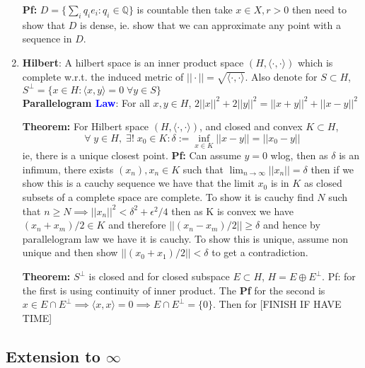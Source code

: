 \documentclass{article}
\begin{document}
\begin{enumerate}
    \textbf{Pf:} \(D = \{\sum_iq_ie_i:q_i \in \mathbb{Q}\}\) is countable then take \(x \in X, r>0\) then need to show that \(D\) is dense, ie. show that we can approximate any point with a sequence in \(D\).
    
    \item \textbf{Hilbert}: A hilbert space is an inner product space \((H, \langle\cdot, \cdot\rangle) \) which is complete w.r.t. the induced metric of \(||\cdot || = \sqrt{\langle\cdot, \cdot\rangle}\). Also denote for \(S\subset H\), \(S^\perp = \{x \in H: \langle x, y \rangle = 0 \; \forall y \in S\}\)\\

    \textbf{Parallelogram \textcolor{blue}{Law}}: For all \(x, y \in H\), \(2||x||^2 + 2 ||y||^2 = ||x + y||^2 + ||x - y||^2\)
    
    \textbf{Theorem: } For Hilbert space \((H, \langle\cdot, \cdot\rangle) \), and closed and convex \(K \subset H\),
    \[
    \forall \;y \in H, \; \exists!\; x_0 \in K: \delta := \inf_{x\in K} ||x- y|| = ||x_0 - y||
    \]
    ie, there is a unique closest point. \textbf{Pf:} Can assume \(y = 0\) wlog, then as \(\delta\) is an infimum, there exists \((x_n), x_n \in K\) such that \(\lim_{n\to\infty}||x_n|| = \delta\) then if we show this is a cauchy sequence we have that the limit \(x_0\) is in \(K\) as closed subsets of a complete space are complete. To show it is cauchy find \(N\) such that \(n \geq N \implies ||x_n||^2< \delta^2 + \epsilon^2/4 \) then as K is convex we have \((x_n + x_m )/2 \in K\) and therefore \(||(x_n - x_m)/2|| \geq \delta\) and hence by parallelogram law we have it is cauchy. To show this is unique, assume non unique and then show \(||(x_0 + x_1)/2|| < \delta\) to get a contradiction.

    \textbf{Theorem: } \(S^\perp\) is closed and for closed subspace \(E \subset H\), \(H = E \oplus E^\perp\). Pf: for the first is using continuity of inner product. The \textbf{Pf} for the second is \(x \in E \cap E^\perp \implies \langle x, x \rangle  = 0 \implies E \cap E^\perp = \{0\}\). Then for [FINISH IF HAVE TIME]

\end{enumerate}

\subsection*{Extension to $\infty$}
\end{document}
